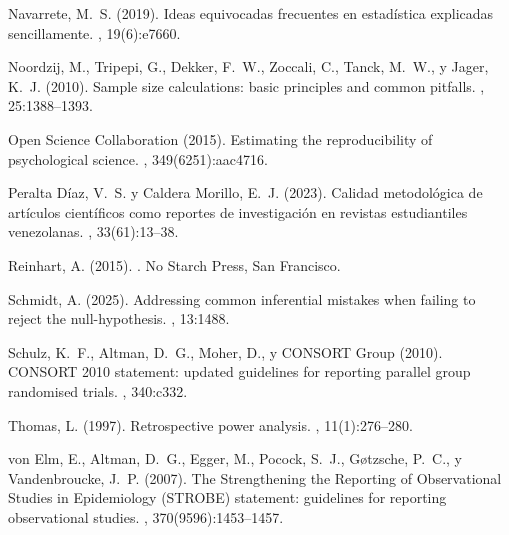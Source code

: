 \begin{thebibliography}{}
Navarrete, M.~S. (2019).
\newblock Ideas equivocadas frecuentes en estadística explicadas sencillamente.
, 19(6):e7660.

Noordzij, M., Tripepi, G., Dekker, F.~W., Zoccali, C., Tanck, M.~W., y Jager, K.~J. (2010).
\newblock Sample size calculations: basic principles and common pitfalls.
, 25:1388--1393.

Open Science Collaboration (2015).
\newblock Estimating the reproducibility of psychological science.
, 349(6251):aac4716.

Peralta Díaz, V.~S. y Caldera Morillo, E.~J. (2023).
\newblock Calidad metodológica de artículos científicos como reportes de investigación en revistas estudiantiles venezolanas.
, 33(61):13--38.

Reinhart, A. (2015).
.
\newblock No Starch Press, San Francisco.

Schmidt, A. (2025).
\newblock Addressing common inferential mistakes when failing to reject the null-hypothesis.
, 13:1488.

Schulz, K.~F., Altman, D.~G., Moher, D., y CONSORT Group (2010).
\newblock CONSORT 2010 statement: updated guidelines for reporting parallel group randomised trials.
, 340:c332.

Thomas, L. (1997).
\newblock Retrospective power analysis.
, 11(1):276--280.

von Elm, E., Altman, D.~G., Egger, M., Pocock, S.~J., G\o{}tzsche, P.~C., y Vandenbroucke, J.~P. (2007).
\newblock The Strengthening the Reporting of Observational Studies in Epidemiology (STROBE) statement: guidelines for reporting observational studies.
, 370(9596):1453--1457.

\end{thebibliography}
